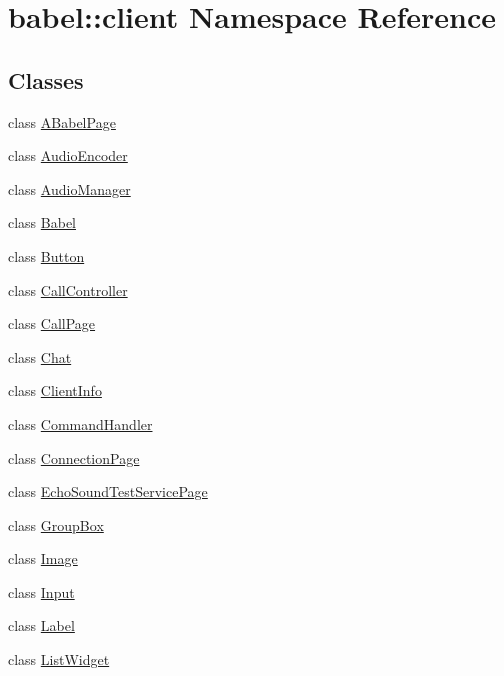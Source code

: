 \hypertarget{namespacebabel_1_1client}{}\section{babel\+:\+:client Namespace Reference}
\label{namespacebabel_1_1client}
\subsection*{Classes}
\begin{DoxyCompactItemize}
\item 
class \mbox{\hyperlink{classbabel_1_1client_1_1_a_babel_page}{A\+Babel\+Page}}
\item 
class \mbox{\hyperlink{classbabel_1_1client_1_1_audio_encoder}{Audio\+Encoder}}
\item 
class \mbox{\hyperlink{classbabel_1_1client_1_1_audio_manager}{Audio\+Manager}}
\item 
class \mbox{\hyperlink{classbabel_1_1client_1_1_babel}{Babel}}
\item 
class \mbox{\hyperlink{classbabel_1_1client_1_1_button}{Button}}
\item 
class \mbox{\hyperlink{classbabel_1_1client_1_1_call_controller}{Call\+Controller}}
\item 
class \mbox{\hyperlink{classbabel_1_1client_1_1_call_page}{Call\+Page}}
\item 
class \mbox{\hyperlink{classbabel_1_1client_1_1_chat}{Chat}}
\item 
class \mbox{\hyperlink{classbabel_1_1client_1_1_client_info}{Client\+Info}}
\item 
class \mbox{\hyperlink{classbabel_1_1client_1_1_command_handler}{Command\+Handler}}
\item 
class \mbox{\hyperlink{classbabel_1_1client_1_1_connection_page}{Connection\+Page}}
\item 
class \mbox{\hyperlink{classbabel_1_1client_1_1_echo_sound_test_service_page}{Echo\+Sound\+Test\+Service\+Page}}
\item 
class \mbox{\hyperlink{classbabel_1_1client_1_1_group_box}{Group\+Box}}
\item 
class \mbox{\hyperlink{classbabel_1_1client_1_1_image}{Image}}
\item 
class \mbox{\hyperlink{classbabel_1_1client_1_1_input}{Input}}
\item 
class \mbox{\hyperlink{classbabel_1_1client_1_1_label}{Label}}
\item 
class \mbox{\hyperlink{classbabel_1_1client_1_1_list_widget}{List\+Widget}}

\end{DoxyCompactItemize}
